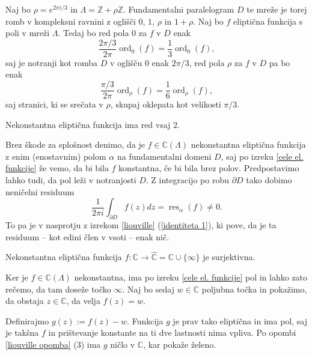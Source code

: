 \documentclass[mat1]{fmfdelo}
\numberwithin{equation}{section}
\newcommand{\Z}{\mathbb Z}
\newcommand{\C}{\mathbb C}
\newcommand{\RS}{\widehat{\C}}
\newcommand{\elf}{\C(\Lambda)}
\newcommand{\res}[2]{\operatorname{res}_{#1}(#2)}
\newcommand{\ord}[2]{\operatorname{ord}_{#1}(#2)}
\theoremstyle{definition}
\begin{document}
\begin{zgled*}
    Naj bo $\rho = e^{2\pi i /3}$ in $\Lambda = \Z + \rho\Z$. Fundamentalni paralelogram $D$ te mreže je torej romb v kompleksni ravnini z oglišči $0$, $1$, $\rho$ in $1 + \rho$. Naj bo $f$ eliptična funkcija s poli v mreži $\Lambda$. Tedaj bo red pola $0$ za $f$ v $D$ enak
    \[
        \frac{2\pi/3}{2\pi}\ord{0}{f} = \frac{1}{3}\ord{0}{f},
    \]
    saj je notranji kot romba $D$ v oglišču $0$ enak $2\pi/3$, red pola $\rho$ za $f$ v $D$ pa bo enak
    \[
        \frac{\pi/3}{2\pi}\ord{\rho}{f} = \frac{1}{6}\ord{\rho}{f},
    \]
    saj stranici, ki se srečata v $\rho$, skupaj oklepata kot velikosti $\pi/3$.
\end{zgled*}

\begin{posledica}
    \label{poseldica o redu elipticne funkcije}
    Nekonstantna eliptična funkcija ima red vsaj $2$.
\end{posledica}

\begin{dokaz}
    Brez škode za splošnost denimo, da je $f \in \elf$ nekonstantna eliptična funkcija z enim (enostavnim) polom $\alpha$ na fundamentalni domeni $D$, saj po izreku \ref{cele el. funkcije} že vemo, da bi bila $f$ konstantna, če bi bila brez polov. 
    Predpostavimo lahko tudi, da pol leži v notranjosti $D$. Z integracijo po robu $\partial D$ tako dobimo neničelni residuum
    \[
        \frac{1}{2 \pi i} \int_{\partial D} f(z)dz = \res{\alpha}{f} \neq 0.  
    \]
    To pa je v nasprotju z izrekom \ref{liouville} (\ref{identiteta 1}), ki pove, da je ta residuum -- kot edini člen v vsoti -- enak nič. 
\end{dokaz}

\begin{posledica}
    \label{elipticna funkcija je surjektivna}
    Nekonstantna eliptična funkcija $f: \C \to \RS = \C \cup \{\infty\}$ je surjektivna. 
\end{posledica}

\begin{dokaz}
    Ker je $f \in \elf$ nekonstantna, ima po izreku \ref{cele el. funkcije} pol in lahko zato rečemo, da tam doseže točko $\infty$. Naj bo sedaj $w \in \C$ poljubna točka in pokažimo, da obstaja $z \in \C$, da velja $f(z) = w$.
    
    Definirajmo $g(z) := f(z) - w$. Funkcija $g$ je prav tako eliptična in ima pol, saj je takšna $f$ in prištevanje konstante na ti dve lastnosti nima vpliva. Po opombi \ref{liouville opomba} (3) ima $g$ ničlo v $\C$, kar pokaže želeno.
\end{dokaz}
\end{document}
